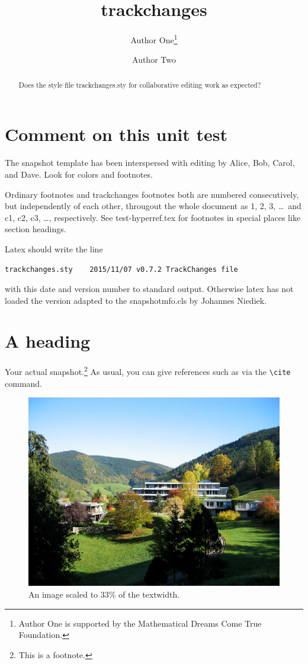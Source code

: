 \documentclass{snapshotmfo}
\author{Author One\thanks{Author One is supported by the Mathematical Dreams Come True Foundation.} \and Author Two}
\title{trackchanges}
\begin{document}

\begin{abstract}
Does the style file trackchanges.sty for collaborative editing work as expected?
\end{abstract}

\section{Comment on this unit test}
The snapshot template has been interspersed with editing by Alice, Bob, Carol, and Dave. Look for colors and footnotes.

Ordinary footnotes and trackchanges footnotes both are numbered consecutively, but independently of each other,
througout the whole document as 1, 2, 3, \dots\ and c1, c2, c3, \dots, respectively.
See test-hyperref.tex for footnotes in special places like section headings.

Latex should write the line
\begin{verbatim}
trackchanges.sty    2015/11/07 v0.7.2 TrackChanges file
\end{verbatim}
with this date and version number to standard output. Otherwise latex has not loaded the version
adapted to the snapshotmfo.cls by Johannes Niediek.

\section{A heading}
Your actual snapshot.\footnote{This is a footnote.} As usual, you can give references such as \cite{knuth1984texbook, wikiMath, sample13, sample12, sample11, sample14} via the \verb+\cite+ command.


\begin{figure}[ht]
        \centering
        \includegraphics[width= 0.33 \textwidth]{mfo.jpg}
        \caption{An image scaled to 33\% of the textwidth.}
\label{fig:sample-image}
\end{figure}
\end{document}
